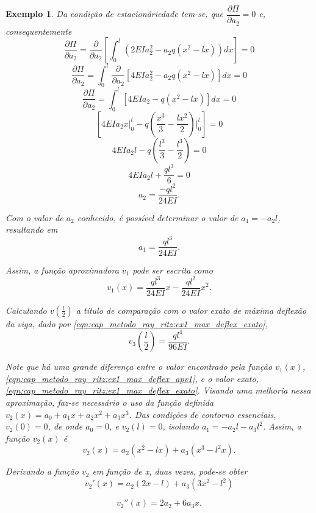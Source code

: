 \documentclass[
	12pt,				%
	openright,			%
    twoside,			%
	a4paper,			%
	english,			%
	french,				%
	spanish,			%
	brazil				%
	]{abntex2}
\newtheorem{exemplo}{Exemplo}
\numberwithin{lema}{chapter}
\numberwithin{teorema}{chapter}
\numberwithin{definicao}{chapter}
\numberwithin{exemplo}{chapter}
\numberwithin{figure}{chapter}
\begin{document}
\begin{exemplo}
	Da condição de estacionáriedade tem-se, que $\dfrac{\partial \Pi}{\partial a_2} = 0$ e, consequentemente
	$$
		\frac{\partial \Pi}{\partial a_2}
		=
		\frac{\partial}{\partial a_2} \left [
			\int_0^l \left ( 2EIa_2 ^2 - a_2 q (x^2 -lx) \right ) dx
		\right]
		= 0
	$$
	$$
		\frac{\partial \Pi}{\partial a_2}
		=
		\int_0^l
			\frac{\partial}{\partial a_2} \left [
			4EIa_2^2 - a_2 q(x^2-lx)
		\right ] dx
		= 0
	$$
	$$
		\frac{\partial \Pi}{\partial a_2}
		=
		\int_0^l \left [
			4EIa_2 - q(x^2-lx)
		\right ] dx
		= 0
	$$
	$$
		\left [ 
			4EIa_2 x \Big |_0^l
			-
			q \left (
				\frac{x^3}{3} - \frac{lx^2}{2}
			\right ) \Big |_0^l
		\right ] 
		= 0
	$$
	$$
		4EIa_2l
		-
		q \left (\frac{l^3}{3} - \frac{l^3}{2} \right )
		= 0
	$$	
	$$
		4EIa_2l+\frac{ql^3}{6} = 0
	$$
	$$
		a_2=\frac{-ql^2}{24EI}\text{.}
	$$

	Com o valor de $a_2$ conhecido, é possível determinar o valor de $a_1=-a_2l$, resultando em
	$$
		a_1=\frac{ql^3}{24EI}
		\text{.}
	$$
	
	Assim, a função aproximadora $v_1$ pode ser escrita como
	$$
		v_1(x)=
		\frac{ql^3}{24EI}x
		-
		\frac{ql^2}{24EI}x^2
		\text{.}
	$$
	
	Calculando $v(\frac{l}{2})$ a título de comparação com o valor exato de máxima deflexão da viga, dado por \eqref{eqn:cap_metodo_ray_ritz:ex1_max_deflex_exato},
	\begin{equation}
		\label{eqn:cap_metodo_ray_ritz:ex1_max_deflex_apv1}
		v_3(\frac{l}{2}) = \frac{ql^4}{96EI}
		\text{.}
	\end{equation}
	
	Note que há uma grande diferença entre o valor encontrado pela função $v_1(x)$, \eqref{eqn:cap_metodo_ray_ritz:ex1_max_deflex_apv1}, e o valor exato, \eqref{eqn:cap_metodo_ray_ritz:ex1_max_deflex_exato}. Visando uma melhoria nessa aproximação, faz-se necessário o uso da função definida $v_2(x)=a_0+a_1x+a_2x^2+a_3x^3$. Das condições de contorno essenciais, $v_2(0)=0$, de onde $a_0=0$, e $v_2(l)=0$, isolando $a_1=-a_2 l - a_3 l^2$. Assim, a função $v_2(x)$ é
	\begin{equation}
		\label{eqn:cap_metodo_ray_ritz:v2_organizada}
		v_2(x)=
		a_2(x^2-lx)
		+
		a_3(x^3-l^2x)
		\text{.}
	\end{equation}
	
	Derivando a função $v_2$ em função de x, duas vezes, pode-se obter
	$$
	v_2'(x) = a_2(2x-l) + a_3(3x^2-l^2)
	$$

	\begin{equation}
		\label{eqn:cap_metodo_ray_ritz:v2_diff_organizada}
		v_2''(x) = 2a_2 + 6a_3 x \text{.}
	\end{equation}
	

\end{exemplo}
\end{document}
